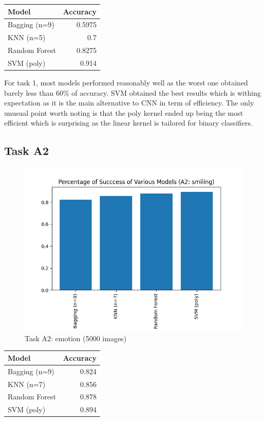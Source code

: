 \documentclass[a4paper,12pt,twoside,twocolumn]{article}
\begin{document}
\begin{center}
\begin{tabular}{lr}
Model & Accuracy\\
\hline
Bagging (n=9) & 0.5975\\
KNN (n=5) & 0.7\\
Random Forest & 0.8275\\
SVM (poly) & 0.914\\
\end{tabular}
\end{center}

For task 1, most models performed reasonably well as the worst one obtained barely less than 60\% of accuracy. SVM obtained the best results which is withing expectation as it is the main alternative to CNN in term of efficiency. The only unusual point worth noting is that the poly kernel ended up being the most efficient which is surprising as the linear kernel is tailored for binary classifiers.\\

\subsection{Task A2}
\label{sec:org2a9c81f}

\begin{center}
\begin{figure}[htbp]
\centering
\includegraphics[width=.9\linewidth]{./images/A2: smiling.png}
\caption{Task A2: emotion (5000 images)}
\end{figure}
\end{center}

\begin{center}
\begin{tabular}{lr}
Model & Accuracy\\
\hline
Bagging (n=9) & 0.824\\
KNN (n=7) & 0.856\\
Random Forest & 0.878\\
SVM (poly) & 0.894\\
\end{tabular}
\end{center}
\end{document}

